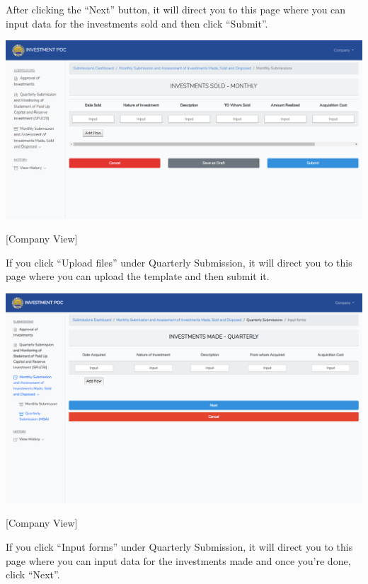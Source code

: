 \documentclass{article}
\begin{document}
After clicking the “Next” button, it will direct
you to this page where you can input data for the investments sold and
then click “Submit”.%

\includegraphics[keepaspectratio=true]{up-ic-screens/image31}{}%

[Company View]%

If you click “Upload files” under Quarterly
Submission, it will direct you to this page where you can upload the
template and then submit it.%

\includegraphics[keepaspectratio=true]{up-ic-screens/image134}{}%

[Company View]%

If you click “Input forms” under Quarterly
Submission, it will direct you to this page where you can input data for
the investments made and once you’re done, click “Next”.%
\end{document}
